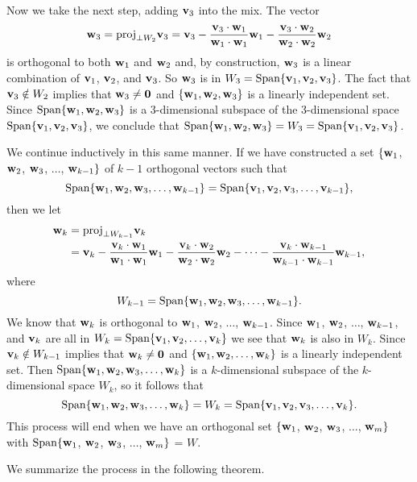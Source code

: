 Now we take the next step, adding $\mathbf{v}_3$ into the mix. The vector
\[\mathbf{w}_3 = \text{proj}_{\perp W_2} \mathbf{v}_3 = \mathbf{v}_3 - \frac{ \mathbf{v}_3 \cdot  \mathbf{w}_1 }{ \mathbf{w}_1 \cdot  \mathbf{w}_1 } \mathbf{w}_1 - \frac{ \mathbf{v}_3 \cdot  \mathbf{w}_2 }{ \mathbf{w}_2 \cdot  \mathbf{w}_2 } \mathbf{w}_2\]
is orthogonal to both $\mathbf{w}_1$ and $\mathbf{w}_2$ and, by construction, $\mathbf{w}_3$ is a linear combination of $\mathbf{v}_1$, $\mathbf{v}_2$, and $\mathbf{v}_3$. So $\mathbf{w}_3$ is in $W_3 = \text{Span}\{\mathbf{v}_1, \mathbf{v}_2, \mathbf{v}_3\}$. The fact that $\mathbf{v}_3 \notin W_2$ implies that $\mathbf{w}_3 \neq \mathbf{0}$ and $\{\mathbf{w}_1, \mathbf{w}_2, \mathbf{w}_3\}$ is a linearly independent set. Since $\text{Span}\{\mathbf{w}_1, \mathbf{w}_2, \mathbf{w}_3\}$ is a 3-dimensional subspace of the 3-dimensional space $\text{Span}\{\mathbf{v}_1,\mathbf{v}_2,\mathbf{v}_3\}$, we conclude that $\text{Span}\{\mathbf{w}_1, \mathbf{w}_2, \mathbf{w}_3\} = W_3 = \text{Span}\{\mathbf{v}_1,\mathbf{v}_2,\mathbf{v}_3\}$.

We continue inductively in this same manner. If we have constructed a set $\{\mathbf{w}_1$, $\mathbf{w}_2$, $\mathbf{w}_3$, $\ldots$, $\mathbf{w}_{k-1}\}$ of $k-1$ orthogonal vectors such that \[\text{Span}\{\mathbf{w}_1, \mathbf{w}_2, \mathbf{w}_3, \ldots, \mathbf{w}_{k-1}\} = \text{Span}\{\mathbf{v}_1,\mathbf{v}_2,\mathbf{v}_3, \ldots, \mathbf{v}_{k-1}\},\]
then we let
\begin{align*}
\mathbf{w}_{k} &= \text{proj}_{\perp W_{k-1}} \mathbf{v}_k \\
	&= \mathbf{v}_k - \displaystyle \frac{ \mathbf{v}_k \cdot  \mathbf{w}_1 }{ \mathbf{w}_1 \cdot  \mathbf{w}_1 } \mathbf{w}_1 - \frac{ \mathbf{v}_k \cdot  \mathbf{w}_2 }{ \mathbf{w}_2 \cdot  \mathbf{w}_2 } \mathbf{w}_2 - \cdots - \frac{ \mathbf{v}_k \cdot  \mathbf{w}_{k-1} }{ \mathbf{w}_{k-1} \cdot  \mathbf{w}_{k-1} } \mathbf{w}_{k-1},
\end{align*}
where 
\[W_{k-1} = \text{Span}\{\mathbf{w}_1, \mathbf{w}_2, \mathbf{w}_3, \ldots, \mathbf{w}_{k-1}\}.\]
We know that $\mathbf{w}_k$ is orthogonal to $\mathbf{w}_1$, $\mathbf{w}_2$, $\ldots$, $\mathbf{w}_{k-1}$. Since $\mathbf{w}_1$, $\mathbf{w}_2$, $\ldots$, $\mathbf{w}_{k-1}$, and $\mathbf{v}_k$ are all in $W_k = \text{Span}\{\mathbf{v}_1, \mathbf{v}_2, \ldots, \mathbf{v}_k\}$ we see that $\mathbf{w}_k$ is also in $W_k$. Since $\mathbf{v}_k \notin W_{k-1}$ implies that $\mathbf{w}_k \neq \mathbf{0}$ and $\{\mathbf{w}_1, \mathbf{w}_2, \ldots, \mathbf{w}_k\}$ is a linearly independent set. Then $\text{Span}\{\mathbf{w}_1, \mathbf{w}_2, \mathbf{w}_3, \ldots, \mathbf{w}_{k}\}$ is a $k$-dimensional subspace of the $k$-dimensional space $W_k$, so it follows that 
\[\text{Span}\{\mathbf{w}_1, \mathbf{w}_2, \mathbf{w}_3, \ldots, \mathbf{w}_{k}\} = W_k = \text{Span}\{\mathbf{v}_1,\mathbf{v}_2,\mathbf{v}_3, \ldots, \mathbf{v}_{k}\}.\] 
This process will end when we have an orthogonal set $\{\mathbf{w}_1$, $\mathbf{w}_2$, $\mathbf{w}_3$, $\ldots$, $\mathbf{w}_{m}\}$ with $\text{Span}\{\mathbf{w}_1$, $\mathbf{w}_2$, $\mathbf{w}_3$, $\ldots$, $\mathbf{w}_{m}\}$ = $W$.

We summarize the process in the following theorem.

